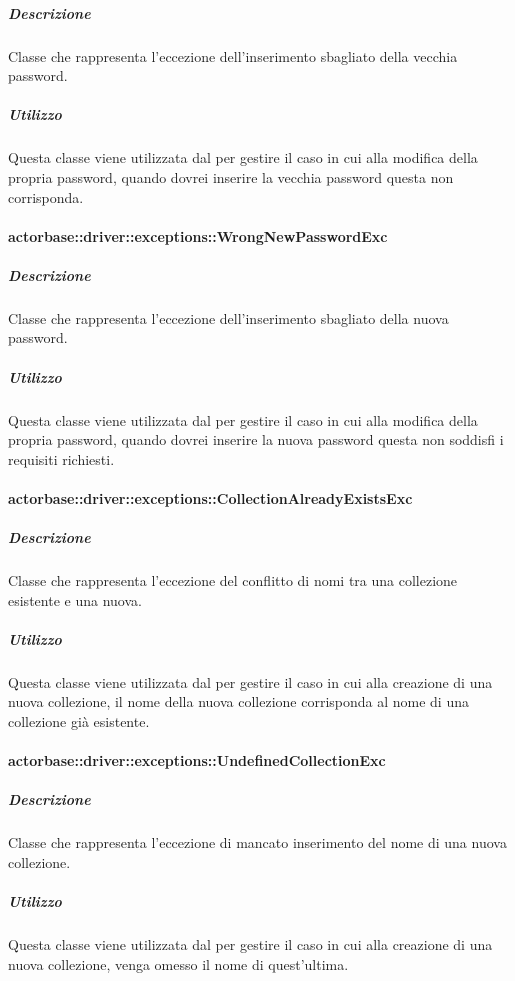 \documentclass{scalatekids-article}
\begin{document}
\subparagraph{Descrizione}

Classe che rappresenta l'eccezione dell'inserimento sbagliato della vecchia password.

\subparagraph{Utilizzo}

Questa classe viene utilizzata dal  per gestire il caso in cui alla modifica della propria password, quando dovrei inserire la vecchia password questa non corrisponda.

\paragraph{actorbase::driver::exceptions::WrongNewPasswordExc}

\subparagraph{Descrizione}

Classe che rappresenta l'eccezione dell'inserimento sbagliato della nuova password.

\subparagraph{Utilizzo}

Questa classe viene utilizzata dal  per gestire il caso in cui alla modifica della propria password, quando dovrei inserire la nuova password questa non soddisfi i requisiti richiesti.

\paragraph{actorbase::driver::exceptions::CollectionAlreadyExistsExc}

\subparagraph{Descrizione}

Classe che rappresenta l'eccezione del conflitto di nomi tra una collezione esistente e una nuova.

\subparagraph{Utilizzo}

Questa classe viene utilizzata dal  per gestire il caso in cui alla creazione di una nuova collezione, il nome della nuova collezione corrisponda al nome di una collezione già esistente.

\paragraph{actorbase::driver::exceptions::UndefinedCollectionExc}

\subparagraph{Descrizione}

Classe che rappresenta l'eccezione di mancato inserimento del nome di una nuova collezione.

\subparagraph{Utilizzo}

Questa classe viene utilizzata dal  per gestire il caso in cui alla creazione di una nuova collezione, venga omesso il nome di quest'ultima.
\end{document}

